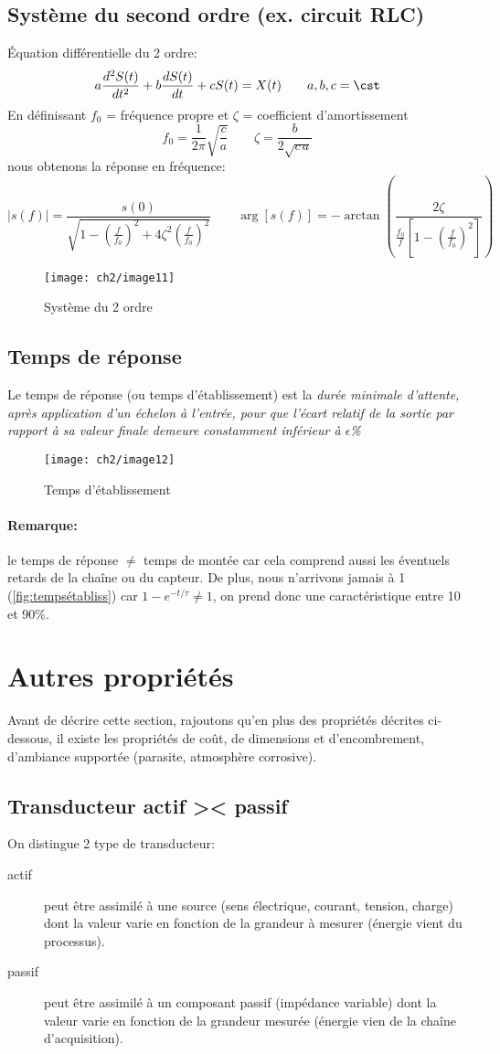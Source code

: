 \subsection{Système du second ordre (ex. circuit RLC)}
Équation différentielle du 2 ordre:
\[
a\frac{d^2 S(t)}{dt^2} + b \frac{d S(t)}{dt} + cS(t) = X(t)\qquad a,b,c=\cst
\]
En définissant $f_0$ = fréquence propre et $\zeta$ = coefficient d'amortissement
\[
f_0 = \frac{1}{2\pi}\sqrt{\frac{c}{a}}\qquad \zeta=\frac{b}{2\sqrt{c\,a}}
\]
nous obtenons la réponse en fréquence:
\[
|s(f)|=\frac{s(0)}{\sqrt{1-\left(\frac{f}{f_0}\right)^2+4\zeta^2\left(\frac{f}{f_0}\right)^2}}\qquad \arg[s(f)] = -\arctan\left(\frac{2\zeta}{\frac{f_0}{f}\left[1-\left(\frac{f}{f_0}\right)^2\right]}\right)
\]

\begin{figure}[H] 
	\centering 
	\texttt{[image: ch2/image11]} 
	\caption{Système du 2 ordre} 
\end{figure}
\subsection{Temps de réponse}
Le temps de réponse (ou temps d'établissement) est la \emph{durée minimale d'attente, après application d'un échelon à l'entrée, pour que l'écart relatif de la sortie par rapport à sa valeur finale demeure constamment inférieur à $\epsilon$\%}
\begin{figure}[H] 
	\centering 
	\texttt{[image: ch2/image12]} 
	\caption{Temps d'établissement} 
	\label{fig:tempsétabliss}
\end{figure}
\paragraph{Remarque:} le temps de réponse $\neq$ temps de montée car cela comprend aussi les éventuels retards de la chaîne ou du capteur. De plus, nous n'arrivons jamais à 1 (\autoref{fig:tempsétabliss}) car $1-e^{-t/\tau}\neq 1$, on prend donc une caractéristique entre 10 et 90\%.
\section{Autres propriétés}
Avant de décrire cette section, rajoutons qu'en plus des propriétés décrites ci-dessous, il existe les propriétés de coût, de dimensions et d'encombrement, d'ambiance supportée (parasite, atmosphère corrosive).
\subsection{Transducteur actif >< passif}
On distingue 2 type de transducteur:
\begin{description}
	\item[actif] peut être assimilé à une source (sens électrique, courant, tension, charge) dont la valeur varie en fonction de la grandeur à mesurer (énergie vient du processus).
	\item[passif] peut être assimilé à un composant passif (impédance variable) dont la valeur varie en fonction de la grandeur mesurée (énergie vien de la chaîne d'acquisition).
\end{description}
